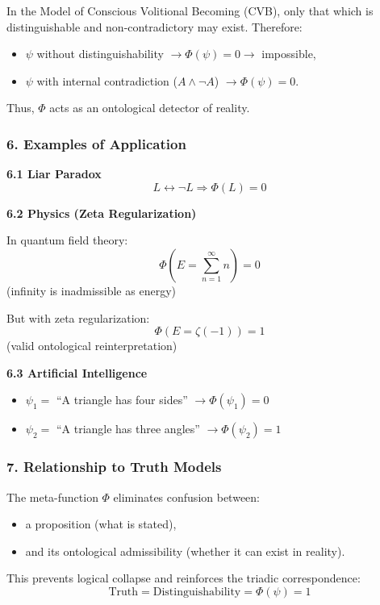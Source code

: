 \documentclass[12pt]{article}
\begin{document}
In the Model of Conscious Volitional Becoming (CVB), only that which is distinguishable and non-contradictory may exist. Therefore:

\begin{itemize}
\item $\psi$ without distinguishability $\to \Phi(\psi) = 0 \to$ impossible,
\item $\psi$ with internal contradiction ($A \land \neg A$) $\to \Phi(\psi) = 0$.
\end{itemize}

Thus, $\Phi$ acts as an ontological detector of reality.

\subsubsection*{6. Examples of Application}

\textbf{6.1 Liar Paradox}
\[
L \leftrightarrow \neg L \Rightarrow \Phi(L) = 0
\]

\textbf{6.2 Physics (Zeta Regularization)}

In quantum field theory:
\[
\Phi(E = \sum_{n=1}^\infty n) = 0
\]
(infinity is inadmissible as energy)

But with zeta regularization:
\[
\Phi(E = \zeta(-1)) = 1
\]
(valid ontological reinterpretation)

\textbf{6.3 Artificial Intelligence}

\begin{itemize}
\item $\psi_1 =$ ``A triangle has four sides'' $\to \Phi(\psi_1) = 0$
\item $\psi_2 =$ ``A triangle has three angles'' $\to \Phi(\psi_2) = 1$
\end{itemize}

\subsubsection*{7. Relationship to Truth Models}

The meta-function $\Phi$ eliminates confusion between:
\begin{itemize}
\item a proposition (what is stated),
\item and its ontological admissibility (whether it can exist in reality).
\end{itemize}

This prevents logical collapse and reinforces the triadic correspondence:
\[
\text{Truth} = \text{Distinguishability} = \Phi(\psi) = 1
\]
\end{document}
